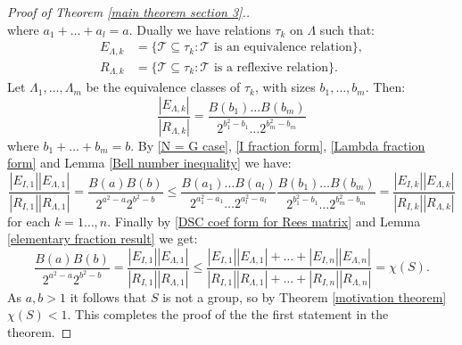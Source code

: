 \documentclass[a4paper, 12pt,reqno]{amsart}
\theoremstyle{plain}
\theoremstyle{definition}
\theoremstyle{remark}
\begin{document}
\begin{proof}[Proof of Theorem \ref{main theorem section 3}.]
\begin{equation}
    \end{equation}
    where $a_1 + \dots + a_l = a$.
    Dually we have relations $\tau_k$ on $\Lambda$ such that:
    \begin{align*}
        E_{\Lambda,k} & = \{\mathcal{T} \subseteq \tau_k : \mathcal{T} \text{ is an equivalence relation} \}, \\
        R_{\Lambda,k} & = \{\mathcal{T} \subseteq \tau_k : \mathcal{T} \text{ is a reflexive relation} \}.
    \end{align*}
    Let $\Lambda_1 , \ldots , \Lambda_m$ be the equivalence classes of $\tau_k$, with sizes $b_1 , \ldots , b_m$.
    Then:
    \begin{equation}
        \label{Lambda fraction form}
        \frac{|E_{\Lambda,k}|} {|R_{\Lambda,k}|} = \frac{B(b_1) \dots B(b_m)}{2^{b_1^2 - b_1} \dots 2^{b_m^2 - b_m}}
    \end{equation}
    where $b_1 + \dots + b_m = b$.
    By \eqref{N = G case}, \eqref{I fraction form}, \eqref{Lambda fraction form} and Lemma \ref{Bell number inequality} we have:
    \begin{equation*}
        \frac{|E_{I,1}||E_{\Lambda,1}| }{|R_{I,1}||R_{\Lambda,1}|} = \frac{B(a)B(b)}{2^{a^2 - a}2^{b^2 - b}} \leq \frac{B(a_1) \dots B(a_l)}{2^{a_1^2 - a_1} \dots 2^{a_l^2 - a_l}} \frac{B(b_1) \dots B(b_m)}{2^{b_1^2 - b_1} \dots 2^{b_m^2 - b_m}} = \frac{|E_{I,k}||E_{\Lambda,k}|}{|R_{I,k}||R_{\Lambda,k}|}
    \end{equation*}
    for each $k = 1 \dots , n$.
    Finally by \eqref{DSC coef form for Rees matrix} and Lemma \ref{elementary fraction result} we get:
    \begin{equation*}
        \frac{B(a) B(b)}{2^{a^2 - a}2^{b^2-b}} = \frac{|E_{I,1}||E_{\Lambda,1}| }{|R_{I,1}||R_{\Lambda,1}|} \leq  \frac{|E_{I,1}||E_{\Lambda ,1}| + \dots + |E_{I,n}||E_{\Lambda,n}|}{|R_{I,1}||R_{\Lambda ,1}| + \dots +|R_{I,n}||R_{\Lambda,n}|} =  \chi(S).
    \end{equation*}
    As $a,b >1$ it follows that $S$ is not a group, so by Theorem \ref{motivation theorem} $\chi(S) < 1$.
    This completes the proof of the the first statement in the theorem.


\end{proof}
\end{document}
